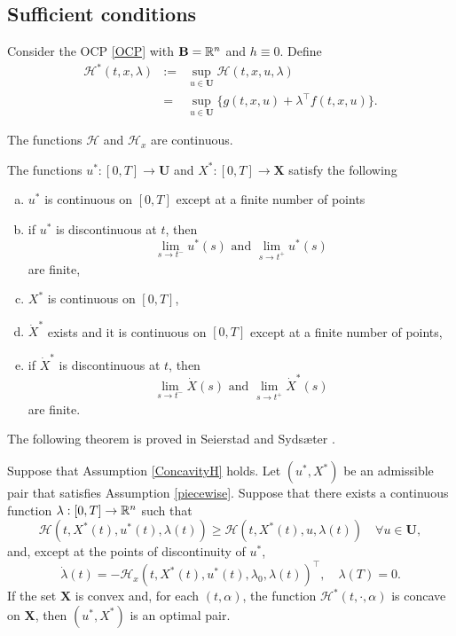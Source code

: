 \subsection{Sufficient conditions}


Consider the OCP \eqref{OCP} with $\mathbf{B}=\mathbb{R}^n$ and $h\equiv 0$. Define
\begin{eqnarray*}
\mathcal{H}^\ast(t,x,\lambda) & := & \sup_{u\in\mathbf{U}}\mathcal{H}(t,x,u,\lambda)\\
     & = & \sup_{u\in\mathbf{U}}\{g(t,x,u) + \lambda^\top f(t,x,u)\}.    
\end{eqnarray*}

\begin{assumption}\label{ConcavityH}\rm The functions $\mathcal{H}$ and $\mathcal{H}_x$ are continuous. 
\end{assumption}

\begin{assumption}\label{piecewise}\rm The functions $u^\ast:[0,T]\to\mathbf{U}$ and $X^\ast:[0,T]\to\mathbf{X}$ satisfy the following
\begin{enumerate}[(a)]
    \item $u^\ast$ is continuous on $[0,T]$ except at a finite number of points 
    \item if $u^\ast$ is discontinuous at $t$, then  
        \[\lim_{s\to t^-}u^\ast(s) \mbox{ and } \lim_{s\to t^+}u^\ast(s)\]
        are finite,
    \item $X^\ast$ is continuous on $[0,T]$, 
    \item $\dot{X}^\ast$ exists and it is continuous on $[0,T]$ except at a finite number of points,
    \item  if $\dot{X}^\ast$ is discontinuous at $t$, then  
        \[\lim_{s\to t^-}\dot{X}(s) \mbox{ and } \lim_{s\to t^+}\dot{X}^\ast(s)\]
        are finite. 
\end{enumerate}
\end{assumption}


The following theorem is proved in Seierstad and Syds\ae ter \cite[Theorem 3]{SeiSyd77}.  

\begin{theorem}\label{SufficientCond} Suppose that Assumption \ref{ConcavityH} holds. Let $(u^\ast,X^\ast)$ be an admissible pair that satisfies Assumption \ref{piecewise}. Suppose that there exists a continuous function $\lambda:[0,T]\to \mathbb{R}^n$ such that 
   \begin{equation}
       \mathcal{H}(t,X^\ast(t),u^\ast(t),\lambda(t)) \geq
       \mathcal{H}(t,X^\ast(t),u,\lambda(t)) \quad \forall u\in\mathbf{U},
   \end{equation}
and, except at the points of discontinuity of $u^\ast$,
    \begin{equation}
         \dot{\lambda}(t) = -\mathcal{H}_x(t,X^\ast(t),u^\ast(t),\lambda_0,\lambda(t))^\top, \quad \lambda(T)=0.
    \end{equation}
If the set $\mathbf{X}$ is convex and, for each $(t,\alpha)$, the function $\mathcal{H}^\ast(t,\cdot,\alpha)$ is concave on $\mathbf{X}$, then $(u^\ast,X^\ast)$ is an optimal pair.
\end{theorem}

